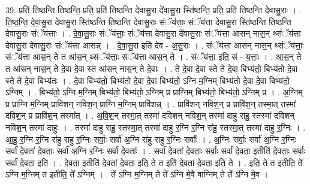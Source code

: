 \documentclass[17pt]{extarticle}
\begin{document}
39. प्रति॑ तिष्ठन्ति तिष्ठन्ति॒ प्रति॒ प्रति॑ तिष्ठन्ति देवासु॒रा दे॑वासु॒रा स्ति॑ष्ठन्ति॒ प्रति॒ प्रति॑ तिष्ठन्ति देवासु॒राः । . ति॒ष्ठ॒न्ति॒ दे॒वा॒सु॒रा दे॑वासु॒रा स्ति॑ष्ठन्ति तिष्ठन्ति देवासु॒राः संॅय॑त्ताः॒ संॅय॑त्ता देवासु॒रा स्ति॑ष्ठन्ति तिष्ठन्ति देवासु॒राः संॅय॑त्ताः । . दे॒वा॒सु॒राः संॅय॑त्ताः॒ संॅय॑त्ता देवासु॒रा दे॑वासु॒राः संॅय॑त्ता आसन् नास॒न् थ्संॅय॑त्ता देवासु॒रा दे॑वासु॒राः संॅय॑त्ता आसन्न् । . दे॒वा॒सु॒रा इति॑ देव - अ॒सु॒राः । . संॅय॑त्ता आसन् नास॒न् थ्संॅय॑त्ताः॒ संॅय॑त्ता आस॒न् ते त आ॑स॒न् थ्संॅय॑त्ताः॒ संॅय॑त्ता आस॒न् ते । . संॅय॑त्ता॒ इति॒ सं - य॒त्ताः॒ । . आ॒स॒न् ते त आ॑सन् नास॒न् ते दे॒वा दे॒वा स्त आ॑सन् नास॒न् ते दे॒वाः । . ते दे॒वा दे॒वा स्ते ते दे॒वा बिभ्य॑तो॒ बिभ्य॑तो दे॒वा स्ते ते दे॒वा बिभ्य॑तः । . दे॒वा बिभ्य॑तो॒ बिभ्य॑तो दे॒वा दे॒वा बिभ्य॑तो॒ ऽग्नि म॒ग्निम् बिभ्य॑तो दे॒वा दे॒वा बिभ्य॑तो॒ ऽग्निम् । . बिभ्य॑तो॒ ऽग्नि म॒ग्निम् बिभ्य॑तो॒ बिभ्य॑तो॒ ऽग्निम् प्र प्राग्निम् बिभ्य॑तो॒ बिभ्य॑तो॒ ऽग्निम् प्र । . अ॒ग्निम् प्र प्राग्नि म॒ग्निम् प्रावि॑शन् नविश॒न् प्राग्नि म॒ग्निम् प्रावि॑शन्न् । . प्रावि॑शन् नविश॒न् प्र प्रावि॑श॒न् तस्मा॒त् तस्मा॑ दविश॒न् प्र प्रावि॑श॒न् तस्मा᳚त् । . अ॒वि॒श॒न् तस्मा॒त् तस्मा॑ दविशन् नविश॒न् तस्मा॑ दाहु राहु॒ स्तस्मा॑ दविशन् नविश॒न् तस्मा॑ दाहुः । . तस्मा॑ दाहु राहु॒ स्तस्मा॒त् तस्मा॑ दाहु र॒ग्नि र॒ग्नि रा॑हु॒ स्तस्मा॒त् तस्मा॑ दाहु र॒ग्निः । . आ॒हु॒ र॒ग्नि र॒ग्नि रा॑हु राहु र॒ग्निः सर्वाः॒ सर्वा॑ अ॒ग्नि रा॑हु राहु र॒ग्निः सर्वाः᳚ । . अ॒ग्निः सर्वाः॒ सर्वा॑ अ॒ग्नि र॒ग्निः सर्वा॑ दे॒वता॑ दे॒वताः॒ सर्वा॑ अ॒ग्नि र॒ग्निः सर्वा॑ दे॒वताः᳚ । . सर्वा॑ दे॒वता॑ दे॒वताः॒ सर्वाः॒ सर्वा॑ दे॒वता॒ इतीति॑ दे॒वताः॒ सर्वाः॒ सर्वा॑ दे॒वता॒ इति॑ । . दे॒वता॒ इतीति॑ दे॒वता॑ दे॒वता॒ इति॒ ते त इति॑ दे॒वता॑ दे॒वता॒ इति॒ ते । . इति॒ ते त इतीति॒ ते᳚ ऽग्नि म॒ग्निम् त इतीति॒ ते᳚ ऽग्निम् । . ते᳚ ऽग्नि म॒ग्निम् ते ते᳚ ऽग्नि मे॒वै वाग्निम् ते ते᳚ ऽग्नि मे॒व । \newline
\pagebreak
{}
\end{document}
